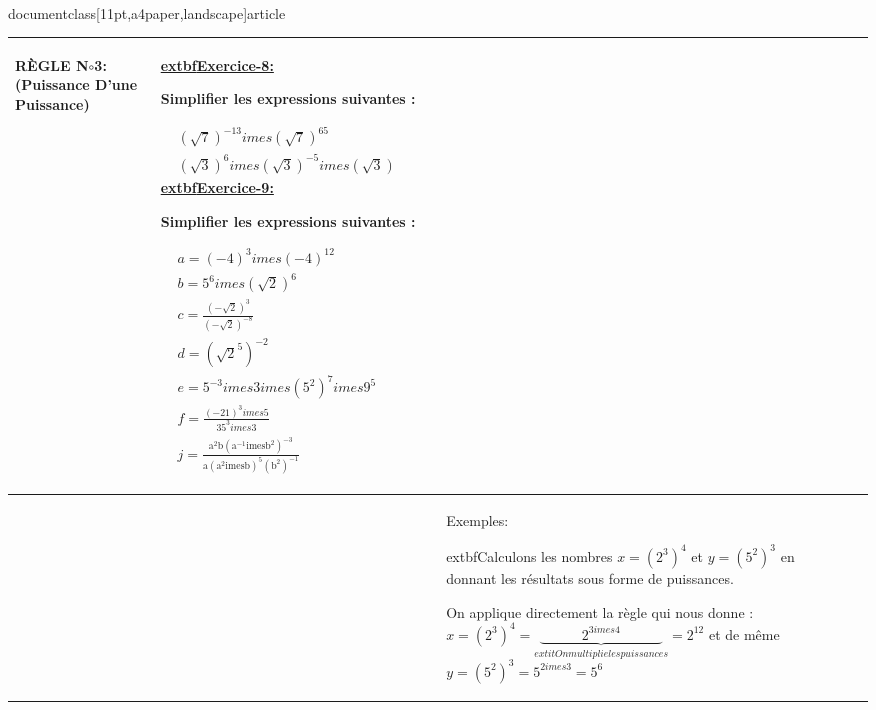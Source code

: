 \\documentclass[11pt,a4paper,landscape]{article}
\begin{document}
\begin{longtable}{|>{\centering\arraybackslash}p{3cm}|>{\raggedright\arraybackslash}p{5cm}|>{\raggedright\arraybackslash}p{13.5cm}|>{\raggedright\arraybackslash}p{5cm}|}
\begin{BoxRafa}[colbacktitle = green]{RÈGLE N$\circ$3:(Puissance D’une Puissance)}
\begin{tikzpicture}[
roundnode/.style={circle, draw=green!60, fill=green!5, very thick, minimum size=7mm},
squarednode/.style={rectangle, draw=red!60, fill=red!5, very thick, minimum size=5mm},
]
\end{tikzpicture}\vspace{-.1cm}
\end{BoxRafa}

&
\colorbox{yellow!50!white}{\uline{\sffamily extbf{Exercice-8:}}}\par
Simplifier les expressions suivantes :

$\begin{aligned}&\left(\sqrt{7}\right)^{-13}imes\left(\sqrt{7}\right)^{65}\\&\left(\sqrt{3}\right)^{6}imes\left(\sqrt{3}\right)^{-5}imes\left(\sqrt{3}\right)\end{aligned}$
\colorbox{yellow!50!white}{\uline{\sffamily extbf{Exercice-9:}}}\par
Simplifier les expressions suivantes :

$\begin{aligned}
&a= (-4)^{3}imes(-4)^{12} \\
&b=5^{6}imes(\sqrt{2})^{6}  \\
&c= \frac{(-\sqrt{2})^{3}}{(-\sqrt{2})^{-8}} \\
&d=\left(\sqrt{2}^{5}\right)^{-2}  \\
&e= 5^{-3}imes3imes(5^{2})^{7}imes9^{5}  \\
&f= \frac{(-21)^{3}imes5}{35^{3}imes3}  \\
&j= \frac{\mathrm{a^{2}b(a^{-1}imes b^{2})^{-3}}}{\mathrm{a(a^{2}imes b)^{5}(b^{2})^{-1}}} 
\end{aligned}$
\\
\hline
&

&	
\vspace{.01cm}
\begin{BoxRafa}[colbacktitle = Orange]{Exemples:}

extbf{Calculons les nombres $x=\left(2^{3}\right)^{4}$ et $y=\left(5^{2}\right)^{3}$ en donnant les résultats sous forme de puissances.}

On applique directement la règle qui nous donne : $x=\left(2^3\right)^4=\underbrace{\qquad\quad2^{3imes4}\qquad\quad}_{extit{On multiplie les puissances}}=2^{12}$ et de même $y=\left(5^2\right)^3=5^{2imes3}=5^6$


\end{BoxRafa}
\end{longtable}
\end{document}
